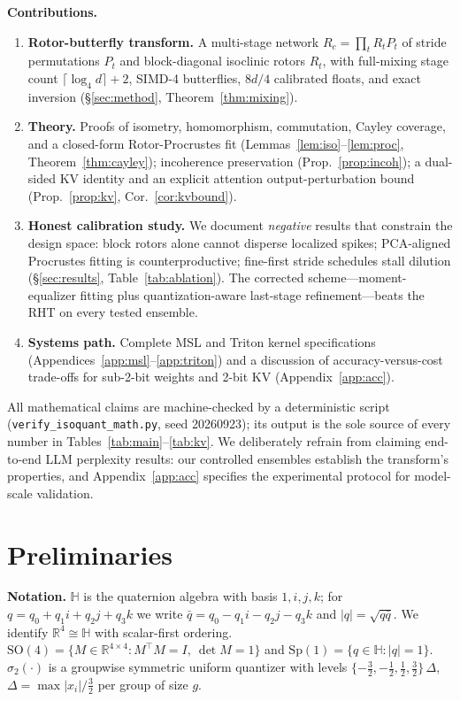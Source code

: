 \documentclass{article}
\newcommand{\R}{\mathbb{R}}
\newcommand{\SO}{\mathrm{SO}}
\newcommand{\Sp}{\mathrm{Sp}}
\begin{document}
\textbf{Contributions.}
\begin{enumerate}[leftmargin=1.5em,itemsep=1pt,topsep=2pt]
\item \textbf{Rotor-butterfly transform.} A multi-stage network
$R_c=\prod_t R_tP_t$ of stride permutations $P_t$ and block-diagonal isoclinic
rotors $R_t$, with full-mixing stage count $\lceil\log_4 d\rceil+2$, SIMD-4
butterflies, $8d/4$ calibrated floats, and exact inversion
(\S\ref{sec:method}, Theorem~\ref{thm:mixing}).
\item \textbf{Theory.} Proofs of isometry, homomorphism, commutation, Cayley
coverage, and a closed-form Rotor-Procrustes fit
(Lemmas~\ref{lem:iso}--\ref{lem:proc}, Theorem~\ref{thm:cayley}); incoherence
preservation (Prop.~\ref{prop:incoh}); a dual-sided KV identity and an explicit
attention output-perturbation bound (Prop.~\ref{prop:kv},
Cor.~\ref{cor:kvbound}).
\item \textbf{Honest calibration study.} We document \emph{negative} results
that constrain the design space: block rotors alone cannot disperse localized
spikes; PCA-aligned Procrustes fitting is counterproductive; fine-first stride
schedules stall dilution (\S\ref{sec:results}, Table~\ref{tab:ablation}).
The corrected scheme---moment-equalizer fitting plus quantization-aware
last-stage refinement---beats the RHT on every tested ensemble.
\item \textbf{Systems path.} Complete MSL and Triton kernel specifications
(Appendices~\ref{app:msl}--\ref{app:triton}) and a discussion of accuracy-versus-cost
trade-offs for sub-2-bit weights and 2-bit KV (Appendix~\ref{app:acc}).
\end{enumerate}

All mathematical claims are machine-checked by a deterministic script
(\texttt{verify\_isoquant\_math.py}, seed 20260923); its output is the sole
source of every number in Tables~\ref{tab:main}--\ref{tab:kv}. We deliberately
refrain from claiming end-to-end LLM perplexity results: our controlled
ensembles establish the transform's properties, and Appendix~\ref{app:acc}
specifies the experimental protocol for model-scale validation.

\section{Preliminaries}
\label{sec:prelim}

\textbf{Notation.} $\mathbb{H}$ is the quaternion algebra with basis
$1,i,j,k$; for $q=q_0+q_1i+q_2j+q_3k$ we write
$\bar q=q_0-q_1i-q_2j-q_3k$ and $|q|=\sqrt{q\bar q}$. We identify
$\R^4\cong\mathbb{H}$ with scalar-first ordering. $\SO(4)=\{M\in\R^{4\times4}:
M^\top M=I,\ \det M=1\}$ and $\Sp(1)=\{q\in\mathbb{H}:|q|=1\}$.
$\sigma_2(\cdot)$ is a groupwise symmetric uniform quantizer with levels
$\{-\tfrac32,-\tfrac12,\tfrac12,\tfrac32\}\,\Delta$,
$\Delta=\max|x_i|/\tfrac32$ per group of size $g$.
\end{document}
